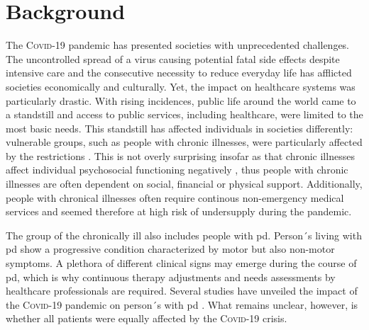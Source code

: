 \documentclass{bmcart}
\begin{document}
\begin{frontmatter}
\begin{abstractbox}
\begin{abstract}
\end{abstract}


\begin{keyword}%
\end{keyword}

\end{abstractbox}

\end{frontmatter}


\section*{Background}
The \textsc{Covid}-19 pandemic has presented societies with unprecedented challenges. The uncontrolled spread of a virus causing potential fatal side effects despite intensive care and the consecutive necessity to reduce everyday life has afflicted societies economically and culturally. Yet, the impact on healthcare systems was particularly drastic. With rising incidences, public life around the world came to a standstill and access to public services, including healthcare, were limited to the most basic needs. This standstill has affected individuals in societies differently: vulnerable groups, such as people with chronic illnesses, were particularly affected by the restrictions \cite{sepulveda2020impact, kasar2021lif, yogev2021covid}. This is not overly surprising insofar as that chronic illnesses affect individual psychosocial functioning negatively \cite{demirtepe2022psychosocial}, thus people with chronic illnesses are often dependent on social, financial or physical support. Additionally, people with chronical illnesses often require continous non-emergency medical services and seemed therefore at high risk of undersupply during the pandemic. 

The group of the chronically ill also includes people with \ac{pd}. Person´s living with \ac{pd} show a progressive condition characterized by motor but also non-motor symptoms. A plethora of different clinical signs may emerge during the course of \ac{pd}, which is why  continuous therapy adjustments and needs assessments by healthcare professionals are required. Several studies have unveiled the impact of the \textsc{Covid}-19 pandemic on person´s with \ac{pd} \cite{yogev2021covid, zipprich2020knowledge, frundt2022impact, richter2021analysis, brooks2021social}. What remains unclear, however, is whether all patients were equally affected by the \textsc{Covid}-19 crisis.
\end{document}
